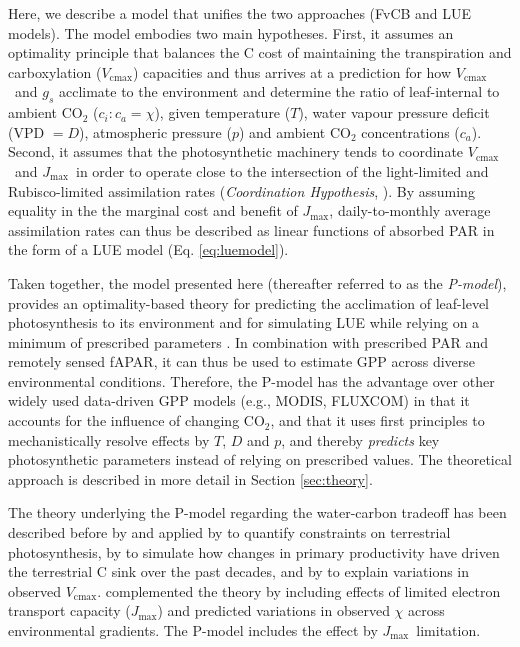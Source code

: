 \documentclass{myreport}
\newcommand{\vcmax}{$V_{\text{cmax}}$}
\newcommand{\jmax}{$J_{\text{max}}$}
\begin{document}
Here, we describe a model that unifies the two approaches (FvCB and LUE models). The model embodies two main hypotheses. First, it assumes an optimality principle that balances the C cost of maintaining the transpiration and carboxylation (\vcmax ) capacities and thus arrives at a prediction for how \vcmax\ and $g_s$ acclimate to the environment and determine the ratio of leaf-internal to ambient CO$_2$ ($c_i:c_a = \chi$), given temperature ($T$), water vapour pressure deficit (VPD $= D$), atmospheric pressure ($p$) and ambient CO$_2$ concentrations ($c_a$). Second, it assumes that the photosynthetic machinery tends to coordinate \vcmax\ and \jmax\ in order to operate close to the intersection of the light-limited and Rubisco-limited assimilation rates (\textit{Coordination Hypothesis}, \cite{chen93, maire12po}). %
By assuming equality in the the marginal cost and benefit of \jmax , daily-to-monthly average assimilation rates can thus be described as linear functions of absorbed PAR in the form of a LUE model (Eq. \ref{eq:luemodel}).  

Taken together, the model presented here (thereafter referred to as the \textit{P-model}), provides an optimality-based theory for predicting the acclimation of leaf-level photosynthesis to its environment \citep{prentice14ecollett} and for simulating LUE while relying on a minimum of prescribed parameters \citep{wang17natpl}. In combination with prescribed PAR and remotely sensed fAPAR, it can thus be used to estimate GPP across diverse environmental conditions. Therefore, the P-model has the advantage over other widely used data-driven GPP models (e.g., MODIS, FLUXCOM) in that it accounts for the influence of changing CO$_2$, and that it uses first principles to mechanistically resolve effects by $T$, $D$ and $p$, and thereby \textit{predicts} key photosynthetic parameters instead of relying on prescribed values. The theoretical approach is described in more detail in Section \ref{sec:theory}.

The theory underlying the P-model regarding the water-carbon tradeoff has been described before by \cite{prentice14ecollett} and applied by \cite{wanghan14} to quantify constraints on terrestrial photosynthesis, by \cite{keenan17natcomm} to simulate how changes in primary productivity have driven the terrestrial C sink over the past decades, and by \cite{smith19ecollett} to explain variations in observed \vcmax .  \cite{wang17natpl} complemented the theory by including effects of limited electron transport capacity (\jmax ) and predicted variations in observed $\chi$ across environmental gradients. The P-model includes the effect by \jmax\ limitation.
\end{document}
